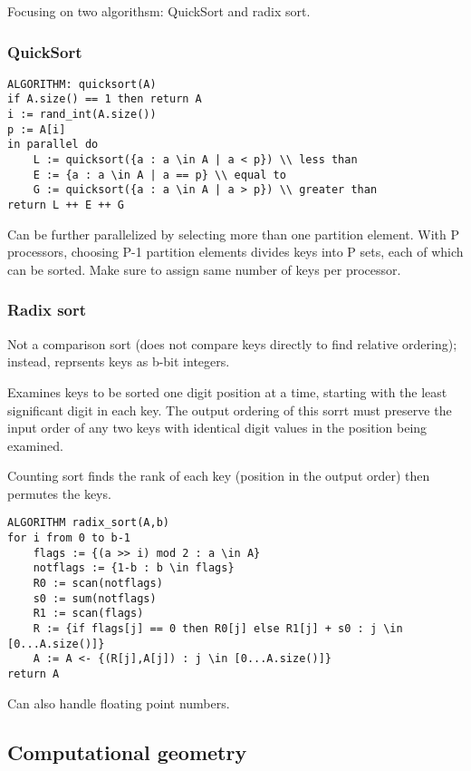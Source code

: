 Focusing on two algorithsm: QuickSort and radix sort. 

\subsubsection{QuickSort}

\begin{lstlisting}
ALGORITHM: quicksort(A)
if A.size() == 1 then return A
i := rand_int(A.size())
p := A[i]
in parallel do
    L := quicksort({a : a \in A | a < p}) \\ less than
    E := {a : a \in A | a == p} \\ equal to
    G := quicksort({a : a \in A | a > p}) \\ greater than
return L ++ E ++ G
\end{lstlisting}

Can be further parallelized by selecting more than one partition element. With P processors, choosing P-1 partition elements divides keys into P sets, each of which can be sorted. Make sure to assign same number of keys per processor. 

\subsubsection{Radix sort}

Not a comparison sort (does not compare keys directly to find relative ordering); instead, reprsents keys as b-bit integers.

Examines keys to be sorted one digit position at a time, starting with the least significant digit in each key. The output ordering of this sorrt must preserve the input order of any two keys with identical digit values in the position being examined. 

Counting sort finds the rank of each key (position in the output order) then permutes the keys.

\begin{lstlisting}
ALGORITHM radix_sort(A,b)
for i from 0 to b-1
    flags := {(a >> i) mod 2 : a \in A}
    notflags := {1-b : b \in flags}
    R0 := scan(notflags)
    s0 := sum(notflags)
    R1 := scan(flags)
    R := {if flags[j] == 0 then R0[j] else R1[j] + s0 : j \in [0...A.size()]}
    A := A <- {(R[j],A[j]) : j \in [0...A.size()]}
return A
\end{lstlisting}

Can also handle floating point numbers.

\subsection{Computational geometry}

